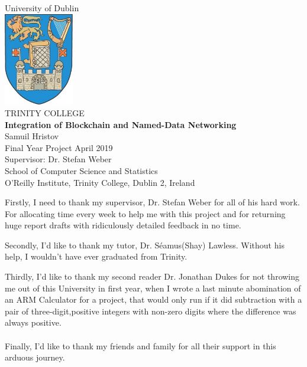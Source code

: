 \documentclass[a4paper, 12pt, oneside]{report}         %
\begin{document}
\begin{titlepage}
\begin{center}
\huge{University of Dublin}\\[2.5mm]
\includegraphics[width=1.2in]{trinity.jpg}\\
\Huge{TRINITY COLLEGE} \\
\vspace{1in}
\Large\textbf{Integration of Blockchain and Named-Data Networking}\\
\vspace{0.5in}
Samuil Hristov\\
Final Year Project April 2019\\
Supervisor: Dr. Stefan Weber\\
\vfill
School of Computer Science and Statistics\\
O'Reilly Institute, Trinity College, Dublin 2, Ireland\\
\end{center}
\end{titlepage}
\thesisdeclarationpage				  %

\thesispermissionpage				  %


\begin{thesisacknowledgments}                     %
 Firstly, I need to thank my supervisor, Dr. Stefan Weber for all of his hard work. For allocating time every week to help me with this project and for returning huge report drafts with ridiculously detailed feedback in no time.\par
 Secondly, I'd like to thank my tutor, Dr. Séamus(Shay) Lawless. Without his help, I wouldn't have ever graduated from Trinity.\par
 Thirdly, I'd like to thank my second reader Dr. Jonathan Dukes for not throwing me out of this University in first year, when I wrote a last minute abomination of an ARM Calculator for a project, that would only run if it did subtraction with a pair of three-digit,positive integers with non-zero digits where the difference was always positive.
 \\
 \\ 
 Finally, I'd like to thank my friends and family for all their support in this arduous journey.
\end{thesisacknowledgments}                       %
\end{document}

